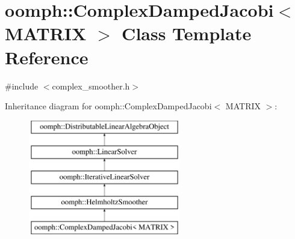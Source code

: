 \hypertarget{classoomph_1_1ComplexDampedJacobi}{}\section{oomph\+:\+:Complex\+Damped\+Jacobi$<$ M\+A\+T\+R\+IX $>$ Class Template Reference}
\label{classoomph_1_1ComplexDampedJacobi}


{\ttfamily \#include $<$complex\+\_\+smoother.\+h$>$}

Inheritance diagram for oomph\+:\+:Complex\+Damped\+Jacobi$<$ M\+A\+T\+R\+IX $>$\+:\begin{figure}[H]
\begin{center}
\leavevmode
\includegraphics[height=5.000000cm]{classoomph_1_1ComplexDampedJacobi}
\end{center}
\end{figure}
